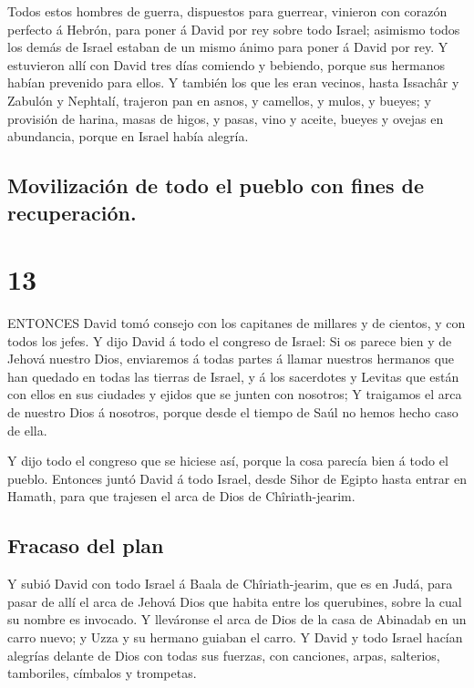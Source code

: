  Todos estos hombres de guerra, dispuestos para guerrear,
vinieron con corazón perfecto á Hebrón, para poner á David por rey sobre
todo Israel; asimismo todos los demás de Israel estaban de un mismo
ánimo para poner á David por rey.  Y estuvieron allí con
David tres días comiendo y bebiendo, porque sus hermanos habían
prevenido para ellos.  Y también los que les eran vecinos,
hasta Issachâr y Zabulón y Nephtalí, trajeron pan en asnos, y camellos,
y mulos, y bueyes; y provisión de harina, masas de higos, y pasas, vino
y aceite, bueyes y ovejas en abundancia, porque en Israel había alegría.

\hypertarget{movilizaciuxf3n-de-todo-el-pueblo-con-fines-de-recuperaciuxf3n.}{%
\subsection{Movilización de todo el pueblo con fines de
recuperación.}\label{movilizaciuxf3n-de-todo-el-pueblo-con-fines-de-recuperaciuxf3n.}}

\hypertarget{section-12}{%
\section{13}\label{section-12}}

 ENTONCES David tomó consejo con los capitanes de millares y
de cientos, y con todos los jefes.  Y dijo David á todo el
congreso de Israel: Si os parece bien y de Jehová nuestro Dios,
enviaremos á todas partes á llamar nuestros hermanos que han quedado en
todas las tierras de Israel, y á los sacerdotes y Levitas que están con
ellos en sus ciudades y ejidos que se junten con nosotros; 
Y traigamos el arca de nuestro Dios á nosotros, porque desde el tiempo
de Saúl no hemos hecho caso de ella.

 Y dijo todo el congreso que se hiciese así, porque la cosa
parecía bien á todo el pueblo.  Entonces juntó David á todo
Israel, desde Sihor de Egipto hasta entrar en Hamath, para que trajesen
el arca de Dios de Chîriath-jearim.

\hypertarget{fracaso-del-plan}{%
\subsection{Fracaso del plan}\label{fracaso-del-plan}}

 Y subió David con todo Israel á Baala de Chîriath-jearim,
que es en Judá, para pasar de allí el arca de Jehová Dios que habita
entre los querubines, sobre la cual su nombre es invocado. 
Y lleváronse el arca de Dios de la casa de Abinadab en un carro nuevo; y
Uzza y su hermano guiaban el carro.  Y David y todo Israel
hacían alegrías delante de Dios con todas sus fuerzas, con canciones,
arpas, salterios, tamboriles, címbalos y trompetas.

